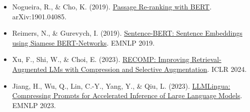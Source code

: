 \begin{itemize}
\tightlist
\item
  Nogueira, R., \& Cho, K. (2019). \href{https://arxiv.org/abs/1901.04085}{Passage Re-ranking with BERT}. arXiv:1901.04085.
\item
  Reimers, N., \& Gurevych, I. (2019). \href{https://arxiv.org/abs/1908.10084}{Sentence-BERT: Sentence Embeddings using Siamese BERT-Networks}. EMNLP 2019.
\item
  Xu, F., Shi, W., \& Choi, E. (2023). \href{https://arxiv.org/abs/2310.04408}{RECOMP: Improving Retrieval-Augmented LMs with Compression and Selective Augmentation}. ICLR 2024.
\item
  Jiang, H., Wu, Q., Lin, C.-Y., Yang, Y., \& Qiu, L. (2023). \href{https://arxiv.org/abs/2310.05736}{LLMLingua: Compressing Prompts for Accelerated Inference of Large Language Models}. EMNLP 2023.
\end{itemize}

\clearpage
